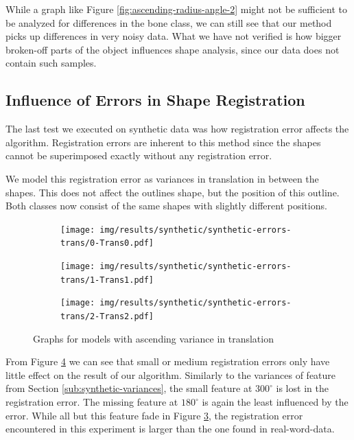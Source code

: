 \documentclass[pdftex,12pt,a4paper]{report}
\begin{document}
While a graph like Figure \ref{fig:ascending-radius-angle-2} might not be sufficient to be analyzed for differences in the bone class, we can still see that our method picks up differences in very noisy data. What we have not verified is how bigger broken-off parts of the object influences shape analysis, since our data does not contain such samples.

\subsection{Influence of Errors in Shape Registration}

The last test we executed on synthetic data was how registration error affects the algorithm. Registration errors are inherent to this method since the shapes cannot be superimposed exactly without any registration error.

We model this registration error as variances in translation in between the shapes. This does not affect the outlines shape, but the position of this outline. Both classes now consist of the same shapes with slightly different positions.

\begin{figure}[h]
	\centering
	\begin{subfigure}[b]{0.32\textwidth}
		\centering
		\texttt{[image: img/results/synthetic/synthetic-errors-trans/0-Trans0.pdf]}
		\label{fig:ascending-translation-0}
	\end{subfigure}
	\begin{subfigure}[b]{0.32\textwidth}
		\centering
		\texttt{[image: img/results/synthetic/synthetic-errors-trans/1-Trans1.pdf]}
		\label{fig:ascending-translation-1}
	\end{subfigure}
	\begin{subfigure}[b]{0.32\textwidth}
		\centering
		\texttt{[image: img/results/synthetic/synthetic-errors-trans/2-Trans2.pdf]}
		\label{fig:ascending-translation-2}
	\end{subfigure}
	\caption{Graphs for models with ascending variance in translation}
	\label{fig:ascending-translation}
\end{figure}

From Figure \ref{fig:ascending-translation} we can see that small or medium registration errors only have little effect on the result of our algorithm. Similarly to the variances of feature from Section \ref{sub:synthetic-variances}, the small feature at $300^\circ$ is lost in the registration error. The missing feature at $180^\circ$ is again the least influenced by the error. While all but this feature fade in Figure \ref{fig:ascending-translation-2}, the registration error encountered in this experiment is larger than the one found in real-word-data.
\end{document}
